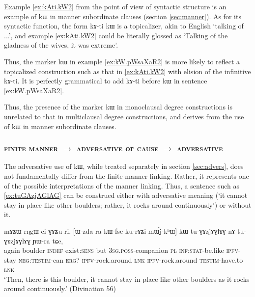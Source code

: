 \documentclass[oldfontcommands,oneside,a4paper,11pt]{article}
\newcommand{\ipa}[1]{{\phon #1}} %
\begin{document}
Example \ref{ex:kAti.kW2}  from the point of view of syntactic structure is an example of \ipa{kɯ} in manner subordinate clauses (section \ref{sec:manner}). As for its syntactic function, the form \ipa{kɤ-ti kɯ} is a topicalizer, akin to English  `talking of ...', and example \ref{ex:kAti.kW2}  could be literally glossed as `Talking of the gladness of the wives, it was extreme'. 
 
Thus, the marker \ipa{kɯ} in example \ref{ex:kW.pWsaXaR2}  is more likely to reflect a topicalized construction such as that in \ref{ex:kAti.kW2}  with elision of the infinitive \ipa{kɤ-ti}. It is perfectly grammatical to add \ipa{kɤ-ti} before \ipa{kɯ} in sentence \ref{ex:kW.pWsaXaR2}. 

Thus, the presence of the marker \ipa{kɯ} in monoclausal degree constructions is unrelated to that in multiclausal degree constructions, and derives from the use of \ipa{kɯ} in manner subordinate clauses. 


 \subsubsection{\textsc{finite manner} $\rightarrow$ \textsc{adversative} or \textsc{cause} $\rightarrow$ \textsc{adversative} }
 
The adversative use of \ipa{kɯ}, while treated separately  in section \ref{sec:advers}, does not fundamentally  differ from the finite manner linking. Rather, it represents one of the possible interpretations of the manner linking. Thus, a sentence such as  \ref{ex:tuGAzjAGlAG} can be construed either with adversative meaning (`it cannot stay in place like other boulders; rather, it rocks around continuously') or without it.
 
 \begin{exe}
\ex \label{ex:tuGAzjAGlAG}
\gll  
    \ipa{mɤʑɯ}  	\ipa{rŋgɯ}  	\ipa{ci}  	\ipa{ɣɤʑu}  	\ipa{ri,}  	[\ipa{ɯ-zda}  	\ipa{ra}  	\ipa{kɯ-fse}  	\ipa{ku-rɤʑi}  	\ipa{mɯ́j-kʰɯ}]  	\ipa{kɯ}  	\ipa{tu-ɣɤzjɤɣlɤɣ}  	\ipa{nɤ}  	\ipa{tu-ɣɤzjɤɣlɤɣ}  	\ipa{ɲɯ-ra}  	\ipa{tɕe,}  \\
    again boulder \textsc{indef} exist:\textsc{sens} but \textsc{3sg.poss}-companion \textsc{pl} \textsc{inf:stat}-be.like \textsc{ipfv}-stay \textsc{neg:testim}-can \textsc{erg}? \textsc{ipfv}-rock.around \textsc{lnk} \textsc{ipfv}-rock.around  \textsc{testim}-have.to \textsc{lnk}     \\
   \glt `Then, there is this boulder, it cannot stay in place like other boulders as it rocks around continuously.' (Divination  56)
 \end{exe}
 
\end{document}
